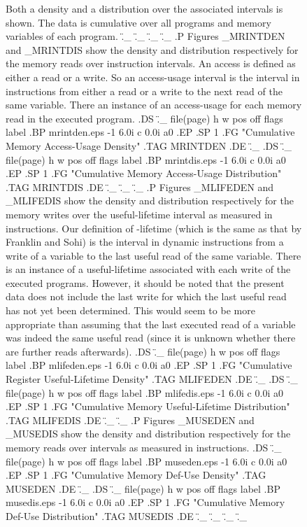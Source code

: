 \documentclass[10pt,twocolumn]{article}
\begin{document}
\begin{figure}
Both a density and a distribution over the
associated intervals is shown.
The data is cumulative over all programs and memory variables
of each program.
.\"_
.\"_
.\"_
.\"_
.P
Figures \_MRINTDEN and \_MRINTDIS show the density and distribution
respectively for the memory reads over instruction intervals.
An access is defined as either a read or a write.
So an access-usage interval is the interval in instructions
from either a read or a write to the next read of the same
variable.  
There an instance of an access-usage for each memory
read in the executed program.
.DS
.\"_ file(page) h w pos off flags label
.BP mrintden.eps -1 6.0i c 0.0i a0
.EP
.SP 1
.FG "Cumulative Memory Access-Usage Density"
.TAG MRINTDEN
.DE
.\"_
.DS
.\"_ file(page) h w pos off flags label
.BP mrintdis.eps -1 6.0i c 0.0i a0
.EP
.SP 1
.FG "Cumulative Memory Access-Usage Distribution"
.TAG MRINTDIS
.DE
.\"_
.\"_
.\"_
.P
Figures \_MLIFEDEN and \_MLIFEDIS show the density and distribution
respectively for the memory writes over the useful-lifetime interval
as measured in instructions.
Our definition of \fIUseful-lifetime\fP 
(which is the same as that by Franklin and Sohi)
is the interval in dynamic instructions from a write of a variable
to the last useful read of the same variable.
There is an instance of a useful-lifetime associated with
each write of the executed programs.  However, it should be noted
that the present data does not include the last write for which
the last useful read has not yet been determined. 
This would seem to be more appropriate than assuming that the
last executed read of a variable was indeed the same useful read (since
it is unknown whether there are further reads afterwards).
.DS
.\"_ file(page) h w pos off flags label
.BP mlifeden.eps -1 6.0i c 0.0i a0
.EP
.SP 1
.FG "Cumulative Register Useful-Lifetime Density"
.TAG MLIFEDEN
.DE
.\"_
.DS
.\"_ file(page) h w pos off flags label
.BP mlifedis.eps -1 6.0i c 0.0i a0
.EP
.SP 1
.FG "Cumulative Memory Useful-Lifetime Distribution"
.TAG MLIFEDIS
.DE
.\"_
.\"_
.P
Figures \_MUSEDEN and \_MUSEDIS show the density and distribution
respectively for the memory reads over
intervals
as measured in instructions.
.DS
.\"_ file(page) h w pos off flags label
.BP museden.eps -1 6.0i c 0.0i a0
.EP
.SP 1
.FG "Cumulative Memory Def-Use Density"
.TAG MUSEDEN
.DE
.\"_
.DS
.\"_ file(page) h w pos off flags label
.BP musedis.eps -1 6.0i c 0.0i a0
.EP
.SP 1
.FG "Cumulative Memory Def-Use Distribution"
.TAG MUSEDIS
.DE
.\"_
.\"_
.\"_
.\"_






\end{figure}
\end{document}

